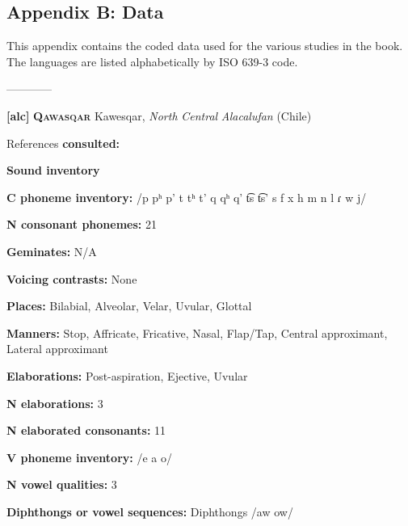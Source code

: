 

\subsection{Appendix B: Data}

This appendix contains the coded data used for the various studies in the book. The languages are listed alphabetically by ISO 639-3 code.



————



\textbf{[alc]}   \textbf{\textsc{Qawasqar}}  Kawesqar, \textit{North} \textit{Central} \textit{Alacalufan} (Chile)



References \textbf{consulted:} \citet{Aguilera2001,Clairis1977,Clairis1985,ViegasBarros1990}



\textbf{Sound inventory}



\textbf{C phoneme inventory:} /p pʰ p’ t tʰ t’ q qʰ q’ t͡s t͡s’ s f x h m n l ɾ w j/



\textbf{N consonant phonemes:} 21



\textbf{Geminates:} N/A



\textbf{Voicing contrasts:} None



\textbf{Places:} Bilabial, Alveolar, Velar, Uvular, Glottal



\textbf{Manners:} Stop, Affricate, Fricative, Nasal, Flap/Tap, Central approximant, Lateral approximant



\textbf{Elaborations:} Post-aspiration, Ejective, Uvular



\textbf{N elaborations:} 3



\textbf{N elaborated consonants:} 11



\textbf{V phoneme inventory:} /e a o/



\textbf{N vowel qualities:} 3



\textbf{Diphthongs or vowel sequences:} Diphthongs /aw ow/



